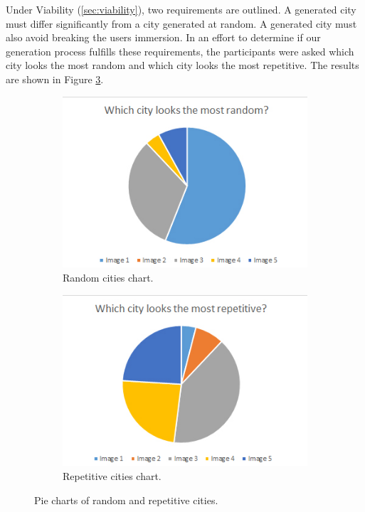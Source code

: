 	Under Viability (\ref{sec:viability}), two requirements are outlined. A generated city must differ significantly from a city generated at random. A generated city must also avoid breaking the users immersion. In an effort to determine if our generation process fulfills these requirements, the participants were asked which city looks the most random and which city looks the most repetitive. The results are shown in Figure \ref{fig:pie-chart-random-repetitive}.
	
	\begin{figure}[h]
		\begin{subfigure}{0.5\textwidth}
			\centering
			\includegraphics[width=0.95\linewidth]{"Images/Random"}
			\caption{Random cities chart.}
			\label{fig:pie-chart-random}
		\end{subfigure}
		\begin{subfigure}{0.5\textwidth}
			\centering
			\includegraphics[width=0.95\linewidth]{"Images/Repetitive"}
			\caption{Repetitive cities chart.}
			\label{fig:pie-chart-repetitive}
		\end{subfigure}
		\caption{Pie charts of random and repetitive cities.}
		\label{fig:pie-chart-random-repetitive}
	\end{figure}
	
